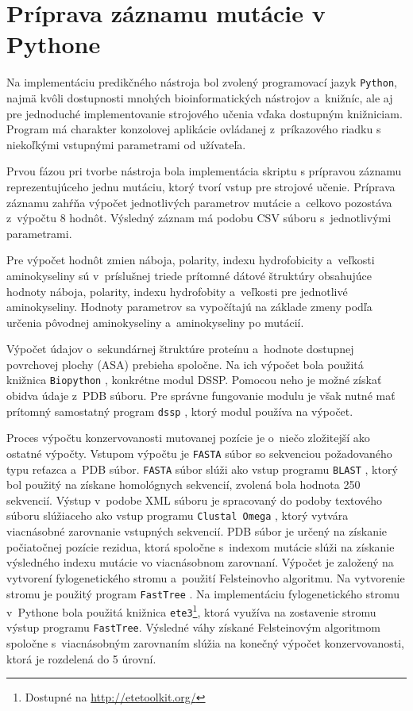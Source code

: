 \section{Príprava záznamu mutácie v Pythone}

Na implementáciu predikčného nástroja bol zvolený programovací jazyk \texttt{Python}, najmä kvôli dostupnosti mnohých bioinformatických nástrojov a~knižníc, ale aj pre jednoduché implementovanie strojového učenia vďaka dostupným knižniciam. Program má charakter konzolovej aplikácie ovládanej z~príkazového riadku s niekoľkými vstupnými parametrami od užívateľa.

Prvou fázou pri tvorbe nástroja bola implementácia skriptu s prípravou záznamu reprezentujúceho jednu mutáciu, ktorý tvorí vstup pre strojové učenie. Príprava záznamu zahŕňa výpočet jednotlivých parametrov mutácie a~celkovo pozostáva z~výpočtu 8 hodnôt. Výsledný záznam má podobu CSV súboru s~jednotlivými parametrami.

Pre výpočet hodnôt zmien náboja, polarity, indexu hydrofobicity a~veľkosti aminokyseliny sú v~príslušnej triede prítomné dátové štruktúry obsahujúce hodnoty náboja, polarity, indexu hydrofobity a~veľkosti pre jednotlivé aminokyseliny. Hodnoty parametrov sa vypočítajú na základe zmeny podľa určenia pôvodnej aminokyseliny a~aminokyseliny po mutácií.

Výpočet údajov o~sekundárnej štruktúre proteínu a~hodnote dostupnej povrchovej plochy (ASA) prebieha spoločne. Na ich výpočet bola použitá knižnica \texttt{Biopython} \cite{biopython}, konkrétne modul DSSP. Pomocou neho je možné získať obidva údaje z~PDB súboru. Pre správne fungovanie modulu je však nutné mať prítomný samostatný program {\tt dssp} \cite{dssp} , ktorý modul používa na výpočet.

Proces výpočtu konzervovanosti mutovanej pozície je o~niečo zložitejší ako ostatné výpočty. Vstupom výpočtu je \texttt{FASTA} súbor so sekvenciou požadovaného typu reťazca a~PDB súbor. \texttt{FASTA} súbor slúži ako vstup programu {\tt BLAST} \cite{blastp}, ktorý bol použitý na získane homológnych sekvencií, zvolená bola hodnota 250 sekvencií. Výstup v~podobe XML súboru je spracovaný do podoby textového súboru slúžiaceho ako vstup programu {\tt Clustal Omega} \cite{clustal}, ktorý vytvára viacnásobné zarovnanie vstupných sekvencií.
PDB súbor je určený na získanie počiatočnej pozície rezidua, ktorá spoločne s~indexom mutácie slúži na získanie výsledného indexu mutácie vo viacnásobnom zarovnaní. Výpočet je založený na vytvorení fylogenetického stromu a~použití Felsteinovho algoritmu. Na vytvorenie stromu je použitý program {\tt FastTree} \cite{fasttree}. Na implementáciu fylogenetického stromu v~Pythone bola použitá knižnica {\tt ete3}\footnote{Dostupné na \url{http://etetoolkit.org/}}, ktorá využíva na zostavenie stromu výstup programu \texttt{FastTree}. Výsledné váhy získané Felsteinovým algoritmom spoločne s~viacnásobným zarovnaním slúžia na konečný výpočet konzervovanosti, ktorá je rozdelená do 5 úrovní.

